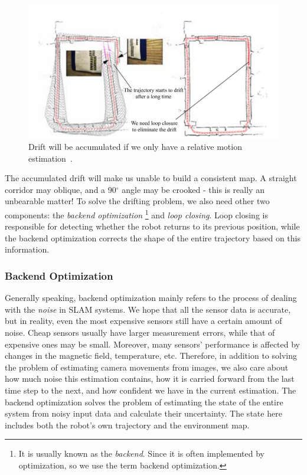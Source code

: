 \begin{figure}
    \centering
    \includegraphics[width=1.0\textwidth]{./resources/whatIsSLAM/loopclosure.pdf}
    \caption{Drift will be accumulated if we only have a relative motion estimation~\cite{Ho2007}.}
    \label{fig:loopclosure}
\end{figure}

The accumulated drift will make us unable to build a consistent map. A straight corridor may oblique, and a 90$^\circ$ angle may be crooked - this is really an unbearable matter! To solve the drifting problem, we also need other two components: the \textit{backend optimization} \footnote{It is usually known as the \textit{backend}. Since it is often implemented by optimization, so we use the term backend optimization.} and \textit{loop closing}. Loop closing is responsible for detecting whether the robot returns to its previous position, while the backend optimization corrects the shape of the entire trajectory based on this information.

\subsubsection{Backend Optimization}
Generally speaking, backend optimization mainly refers to the process of dealing with the \emph{noise} in SLAM systems. We hope that all the sensor data is accurate, but in reality, even the most expensive sensors still have a certain amount of noise. Cheap sensors usually have larger measurement errors, while that of expensive ones may be small. Moreover, many sensors' performance is affected by changes in the magnetic field, temperature, etc. Therefore, in addition to solving the problem of estimating camera movements from images, we also care about how much noise this estimation contains, how it is carried forward from the last time step to the next, and how confident we have in the current estimation. The backend optimization solves the problem of estimating the state of the entire system from noisy input data and calculate their uncertainty. The state here includes both the robot's own trajectory and the environment map.

